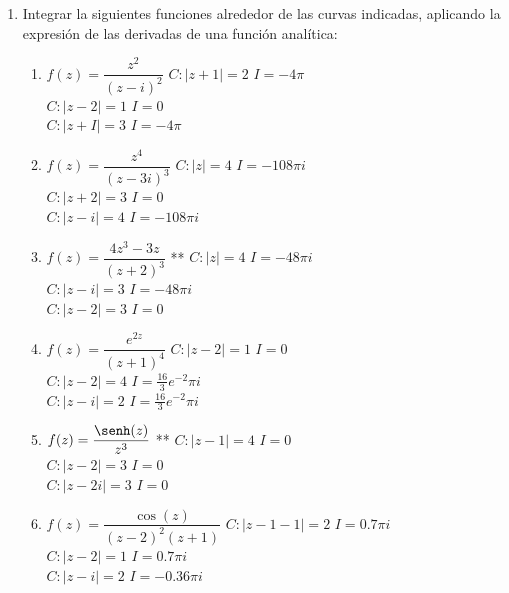 \documentclass[10pt,a4paper]{article}
\begin{document}
\begin{enumerate}
\item {Integrar la siguientes funciones alrededor de las curvas indicadas,  aplicando 
	la expresi\'on de las derivadas de una funci\'on anal\'itica:}	
\begin{enumerate}
	\item %
	$f(z)=\dfrac{z^2}{(z-i)^2}$ 	\tabto{5cm} $C:|z+1|=2$ \tabto{10cm}  $I=-4\pi$ \\
										\tabto{5cm} $C:|z-2|=1$ \tabto{10cm}  $I=0$ \\
									 	\tabto{5cm} $C:|z+I|=3$ \tabto{10cm}  $I=-4\pi$	
	\item %
	$f(z)=\dfrac{z^4}{(z-3i)^3}$	\tabto{5cm} $C:|z|=4$ \tabto{10cm}  $I=-108\pi i$ \\
								\tabto{5cm} $C:|z+2|=3$ \tabto{10cm}  $I=0$ \\
							 	\tabto{5cm} $C:|z-i|=4$ \tabto{10cm}  $I=-108\pi i$	
	\item %
	$f(z)=\dfrac{4z^3-3z}{(z+2)^3}$ **	\tabto{5cm} $C:|z|=4$ \tabto{10cm}  $I=-48\pi i$ \\
								\tabto{5cm} $C:|z-i|=3$ \tabto{10cm}  $I=-48\pi i$ \\
							 	\tabto{5cm} $C:|z-2|=3$ \tabto{10cm}  $I=0$
	\item %
	$f(z)=\dfrac{e^{2z}}{(z+1)^4}$\tabto{5cm} $C:|z-2|=1$ \tabto{10cm} $I=0$ \\
								\tabto{5cm} $C:|z-2|=4$ \tabto{10cm} $I=\frac{16}{3}e^{-2}\pi i$ \\
							 	\tabto{5cm} $C:|z-i|=2$ \tabto{10cm} $I=\frac{16}{3}e^{-2}\pi i$ 
	\item %
	$f(z)=\dfrac{\senh(z)}{z^3}$ **\tabto{5cm} $C:|z-1|=4$ \tabto{10cm} $I=0$ \\
								\tabto{5cm} $C:|z-2|=3$ \tabto{10cm} $I=0$ \\
							 	\tabto{5cm} $C:|z-2i|=3$ \tabto{10cm} $I=0$
	\item %
	$f(z)=\dfrac{\cos(z)}{(z-2)^2(z+1)}$\tabto{5cm} $C:|z-1-1|=2$ \tabto{10cm} $I=0.7\pi i$ \\
								\tabto{5cm} $C:|z-2|=1$ \tabto{10cm} $I=0.7\pi i$ \\
							 	\tabto{5cm} $C:|z-i|=2$ \tabto{10cm} $I=-0.36\pi i$
\end{enumerate}

\end{enumerate}
\end{document}
